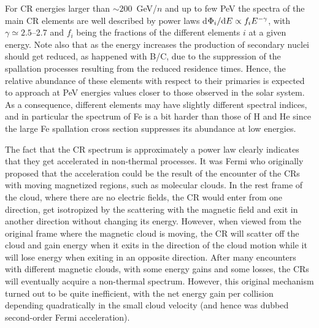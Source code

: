 \documentclass[twoside,12pt]{article}
\begin{document}
For CR energies larger than $\sim 200$~GeV/$n$ and up to few PeV the spectra of the main CR elements are well described by power laws  d$\Phi_i/{\rm d}E\propto f_i E^{-\gamma}$, with $\gamma\simeq 2.5$--2.7 and $f_i$ being the fractions  of the different elements $i$ at a given energy. 
Note also that
as the energy increases the production of secondary nuclei should get reduced, as happened with B/C, due to the  suppression of the spallation processes resulting from the reduced residence times. Hence, the relative abundance of these elements with respect to their primaries is expected to approach at PeV energies values closer to those observed in the solar system.  As a consequence,  different elements may have slightly different spectral indices, and in particular the spectrum of Fe is a bit harder than those of H and He since the large Fe spallation cross section suppresses its abundance at low energies.

The fact that the CR spectrum is approximately a power law clearly indicates that they get accelerated in non-thermal processes. It was Fermi \cite{fe49} who originally proposed that the acceleration could be the result of the encounter of the CRs with moving magnetized regions, such as molecular clouds. In the rest frame of the cloud, where there are no electric fields, the CR would enter from one direction, get isotropized by the scattering with the magnetic field and exit in another direction without changing its energy. However, when viewed from  the original frame where the magnetic cloud is moving, the CR will scatter off the cloud and  gain energy when it exits in the direction of the cloud motion while it will lose energy when exiting in an opposite direction. After many encounters with different magnetic clouds, with some energy gains and some losses, the CRs will eventually  acquire a non-thermal spectrum. However,  this original mechanism turned out to be quite inefficient, with the net energy gain per collision depending quadratically in the small cloud velocity (and hence was dubbed second-order Fermi acceleration).
\end{document}
